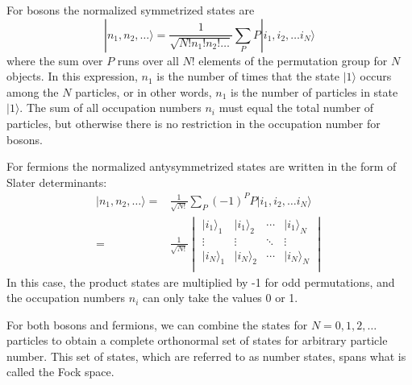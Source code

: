 \documentclass[11pt,letter]{article}
\begin{document}
For bosons the normalized symmetrized states are
\begin{equation} 
  | n_{1},  n_{2}, \ldots \rangle = 
  \frac{1}{\sqrt{N!n_{1}!n_{2}!\ldots}} \sum_{P}  P | i_{1},  i_{2}, \ldots i_{N} \rangle
\end{equation} 
where the sum over $P$ runs over all $N!$ elements of the permutation group for
$N$ objects.  In this expression, $n_{1}$ is the number of times that the state
$|1\rangle$ occurs among the $N$ particles,  or in other words, $n_{1}$ is the
number of particles in state $|1\rangle$.  The sum of all occupation numbers
$n_{i}$ must equal the total number of particles, but otherwise there is no
restriction in the occupation number for bosons.

For fermions the normalized antysymmetrized states are written in the form of
Slater determinants: \begin{equation}
\begin{split}
  | n_{1},  n_{2}, \ldots \rangle = &
  \frac{1}{\sqrt{N!}} \sum_{P} (- 1)^{P} P | i_{1},  i_{2}, \ldots i_{N} \rangle \\
  = &
  \frac{1}{\sqrt{N!}}
  \begin{vmatrix}
  |i_{1}\rangle_{1} & |i_{1}\rangle_{2} & \dotsm & |i_{1}\rangle_{N} \\
  \vdots &  \vdots &  \ddots   & \vdots \\
  |i_{N}\rangle_{1} & |i_{N}\rangle_{2} & \dotsm & |i_{N}\rangle_{N} \\
\end{vmatrix}
\end{split} 
  \label{eq:antisymmetrize} 
\end{equation}  
In this case, the product states are multiplied by -1 for odd permutations, and
the occupation numbers $n_{i}$ can only take the values 0 or 1. 

For both bosons and fermions, we can combine the states for $N=0,1,2,\ldots$
particles to obtain a complete orthonormal set of states for arbitrary particle
number.  This set of states, which are referred to as number states, spans what
is called the Fock space.   
\end{document}
